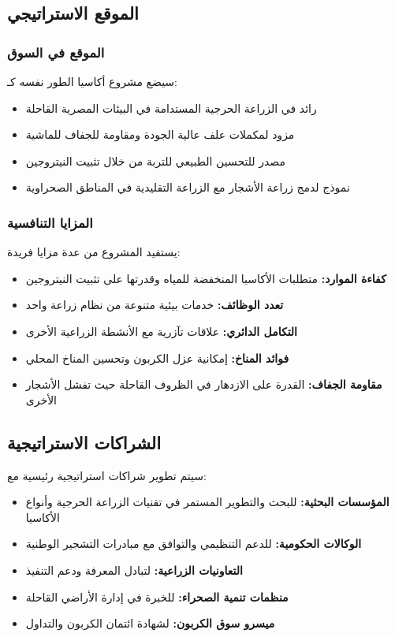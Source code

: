 \subsection{الموقع الاستراتيجي}

\subsubsection{الموقع في السوق}
سيضع مشروع أكاسيا الطور نفسه كـ:

\begin{itemize}
    \item رائد في الزراعة الحرجية المستدامة في البيئات المصرية القاحلة
    \item مزود لمكملات علف عالية الجودة ومقاومة للجفاف للماشية
    \item مصدر للتحسين الطبيعي للتربة من خلال تثبيت النيتروجين
    \item نموذج لدمج زراعة الأشجار مع الزراعة التقليدية في المناطق الصحراوية
\end{itemize}

\subsubsection{المزايا التنافسية}
يستفيد المشروع من عدة مزايا فريدة:

\begin{itemize}
    \item \textbf{كفاءة الموارد:} متطلبات الأكاسيا المنخفضة للمياه وقدرتها على تثبيت النيتروجين
    \item \textbf{تعدد الوظائف:} خدمات بيئية متنوعة من نظام زراعة واحد
    \item \textbf{التكامل الدائري:} علاقات تآزرية مع الأنشطة الزراعية الأخرى
    \item \textbf{فوائد المناخ:} إمكانية عزل الكربون وتحسين المناخ المحلي
    \item \textbf{مقاومة الجفاف:} القدرة على الازدهار في الظروف القاحلة حيث تفشل الأشجار الأخرى
\end{itemize}

\subsection{الشراكات الاستراتيجية}

سيتم تطوير شراكات استراتيجية رئيسية مع:

\begin{itemize}
    \item \textbf{المؤسسات البحثية:} للبحث والتطوير المستمر في تقنيات الزراعة الحرجية وأنواع الأكاسيا
    \item \textbf{الوكالات الحكومية:} للدعم التنظيمي والتوافق مع مبادرات التشجير الوطنية
    \item \textbf{التعاونيات الزراعية:} لتبادل المعرفة ودعم التنفيذ
    \item \textbf{منظمات تنمية الصحراء:} للخبرة في إدارة الأراضي القاحلة
    \item \textbf{ميسرو سوق الكربون:} لشهادة ائتمان الكربون والتداول
\end{itemize}

